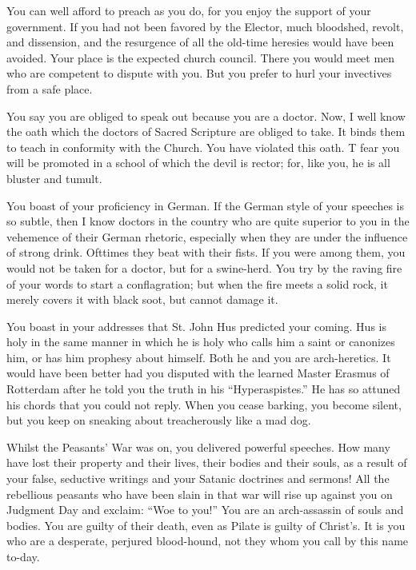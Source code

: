 You can well afford to preach as you do, for you enjoy the support of
your government. If you had not been favored by the Elector, much bloodshed,
revolt, and dissension, and the resurgence of all the old-time heresies
would have been avoided. Your place is the expected church council. There
you would meet men who are competent to dispute with you. But you prefer
to hurl your invectives from a safe place.

You say you are obliged to speak out because you are a doctor. Now,
I well know the oath which the doctors of Sacred Scripture are obliged to
take. It binds them to teach in conformity with the Church. You have
violated this oath. T fear you will be promoted in a school of which the devil
is rector; for, like you, he is all bluster and tumult.

You boast of your proficiency in German. If the German style of your
speeches is so subtle, then I know doctors in the country who are quite superior
to you in the vehemence of their German rhetoric, especially when
they are under the influence of strong drink. Ofttimes they beat with their
fists. If you were among them, you would not be taken for a doctor, but
for a swine-herd. You try by the raving fire of your words to start
a conflagration; but when the fire meets a solid rock, it merely covers it with
black soot, but cannot damage it.

You boast in your addresses that St. John Hus predicted your coming.
Hus is holy in the same manner in which he is holy who calls him a saint
or canonizes him, or has him prophesy about himself. Both he and you are
arch-heretics. It would have been better had you disputed with the learned
Master Erasmus of Rotterdam after he told you the
truth in his “Hyperaspistes.” He has so attuned his chords that you
could not reply. When you cease barking, you become silent, but you keep on sneaking about
treacherously like a mad dog.

Whilst the Peasants’ War was on, you delivered powerful speeches. How
many have lost their property and their lives, their bodies and their souls, as
a result of your false, seductive writings and your Satanic doctrines and
sermons! All the rebellious peasants who have been slain in that war will rise
up against you on Judgment Day and exclaim: “Woe to you!” You are an
arch-assassin of souls and bodies. You are guilty of their death, even as Pilate
is guilty of Christ’s. It is you who are a desperate, perjured blood-hound, not
they whom you call by this name to-day.

